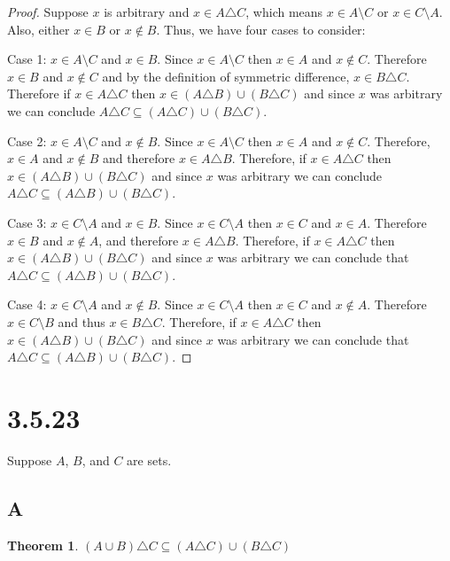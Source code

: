\documentclass{article}
\newtheorem*{theorem}{Theorem}  %
\begin{document}
\begin{proof}
Suppose $x$ is arbitrary and $x \in A \triangle C$, which means $x \in A \setminus C$ or $x \in C \setminus A$. Also, either $x \in B$ or $x \notin B$. Thus, we have four cases to consider:

Case 1: $x \in A \setminus C$ and $x \in B$. Since $x \in A \setminus C$ then $x \in A$ and $x \notin C$. Therefore $x \in B$ and $x \notin C$ and by the definition of symmetric difference, $x \in B \triangle C$. Therefore if $x \in A \triangle C$ then $x \in (A \triangle B) \cup (B \triangle C)$ and since $x$ was arbitrary we can conclude $A \triangle C \subseteq (A \triangle C) \cup (B \triangle C)$.

Case 2: $x \in A \setminus C$ and $x \notin B$. Since $x \in A \setminus C$ then $x \in A$ and $x \notin C$. Therefore, $x \in A$ and $x \notin B$ and therefore $x \in A \triangle B$. Therefore, if $x \in A \triangle C$ then $x \in (A \triangle B) \cup (B \triangle C)$ and since $x$ was arbitrary we can conclude $A \triangle C \subseteq (A \triangle B) \cup (B \triangle C)$.

Case 3: $x \in C \setminus A$ and $x \in B$. Since $x \in C \setminus A$ then $x \in C$ and $x \in A$. Therefore $x \in B$ and $x \notin A$, and therefore $x \in A \triangle B$. Therefore, if $x \in A \triangle C$ then $x \in (A \triangle B) \cup (B \triangle C)$ and since $x$ was arbitrary we can conclude that $A \triangle C \subseteq (A \triangle B) \cup (B \triangle C)$.

Case 4: $x \in C \setminus A$ and $x \notin B$. Since $x \in C \setminus A$ then $x \in C$ and $x \notin A$. Therefore $x \in C \setminus B$ and thus $x \in B \triangle C$. Therefore, if $x \in A \triangle C$ then $x \in (A \triangle B) \cup (B \triangle C)$ and since $x$ was arbitrary we can conclude that $A \triangle C \subseteq (A \triangle B) \cup (B \triangle C)$. 
\end{proof}

\section*{3.5.23}

Suppose $A$, $B$, and $C$ are sets.

\subsection*{A}
\begin{theorem} $( A \cup B ) \triangle C \subseteq (A \triangle C) \cup (B \triangle C)$
\end{theorem}
\end{document}
